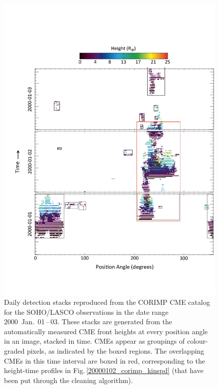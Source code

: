 \documentclass[referee,a4paper,12pt,traditabstract]{swsc}
\begin{document}
\begin{figure}[t]
\centerline{\includegraphics[scale=0.5, trim=20 70 0 140, clip=true]{pa_total.pdf}}
\caption{Daily detection stacks reproduced from the CORIMP CME catalog for the SOHO/LASCO observations in the date range 2000~Jan.~01\,--\,03. These stacks are generated from the automatically measured CME front heights at every position angle in an image, stacked in time. CMEs appear as groupings of colour-graded pixels, as indicated by the boxed regions. The overlapping CMEs in this time interval are boxed in red, corresponding to the height-time profiles in Fig.\,\ref{20000102_corimp_kinspd} (that have been put through the cleaning algorithm).}
\label{pa_total}
\end{figure}
\end{document}
